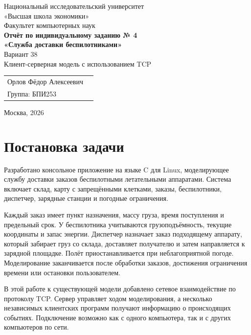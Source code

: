 \documentclass[12pt,a4paper]{article}
\begin{document}
\begin{titlepage}
\thispagestyle{empty}
\begin{center}
{\large Национальный исследовательский университет\\ «Высшая школа экономики»}\\[0.4cm]
{\large Факультет компьютерных наук}\\[2.5cm]
{\LARGE\bfseries Отчёт по индивидуальному заданию № 4}\\[0.5cm]
{\Large\bfseries «Служба доставки беспилотниками»}\\[0.3cm]
{\large Вариант 38}\\[0.8cm]
{\large Клиент-серверная модель с использованием TCP}\\[2.6cm]
\end{center}
\begin{flushright}
\begin{tabular}{@{}ll@{}}
Орлов Фёдор Алексеевич\\[0.4cm]
Группа: БПИ253 
\end{tabular}
\end{flushright}
\vfill
\begin{center}Москва, 2026\end{center}
\end{titlepage}

\tableofcontents
\newpage

\section{Постановка задачи}

Разработано консольное приложение на языке C для Linux, моделирующее службу доставки заказов беспилотными летательными аппаратами. Система включает склад, карту с запрещёнными клетками, заказы, беспилотники, диспетчер, зарядные станции и погодные ограничения.

Каждый заказ имеет пункт назначения, массу груза, время поступления и предельный срок. У беспилотника учитываются грузоподъёмность, текущие координаты и запас энергии. Диспетчер назначает заказ подходящему аппарату, который забирает груз со склада, доставляет получателю и затем направляется к зарядной площадке. Полёт приостанавливается при неблагоприятной погоде. Моделирование заканчивается после обработки заказов, достижения ограничения времени или остановки пользователем.

В этой работе к существующей модели добавлено сетевое взаимодействие по протоколу TCP. Сервер управляет ходом моделирования, а несколько независимых клиентских программ получают информацию о происходящих событиях. Подключение возможно как с одного компьютера, так и с других компьютеров по сети.
\end{document}
